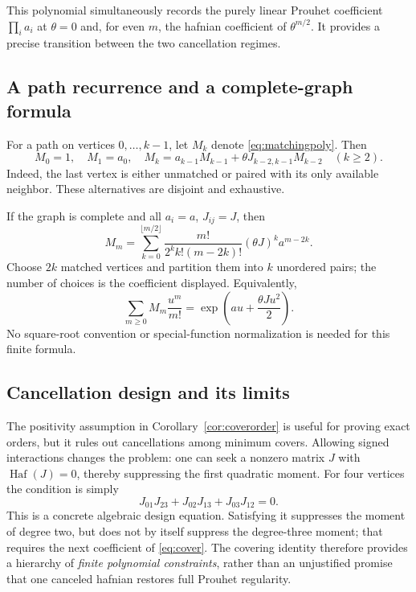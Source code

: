\documentclass[11pt,oneside]{article}
\numberwithin{equation}{section}
\theoremstyle{definition}
\theoremstyle{remark}
\DeclareMathOperator{\Haf}{Haf}
\begin{document}
This polynomial simultaneously records the purely linear Prouhet coefficient
\(\prod_i a_i\) at \(\theta=0\) and, for even \(m\), the hafnian coefficient
of \(\theta^{m/2}\). It provides a precise transition between the two
cancellation regimes.

\subsection{A path recurrence and a complete-graph formula}
For a path on vertices \(0,\ldots,k-1\), let \(M_k\) denote
\eqref{eq:matchingpoly}. Then
\begin{equation}
 M_0=1,\quad M_1=a_0,\quad
 M_k=a_{k-1}M_{k-1}+\theta J_{k-2,k-1}M_{k-2}\quad(k\ge2).
 \label{eq:pathmatchrec}
\end{equation}
Indeed, the last vertex is either unmatched or paired with its only available
neighbor. These alternatives are disjoint and exhaustive.

If the graph is complete and all \(a_i=a\), \(J_{ij}=J\), then
\begin{equation}
 M_m=\sum_{k=0}^{\lfloor m/2\rfloor}
       \frac{m!}{2^k k!(m-2k)!}(\theta J)^k a^{m-2k}.
 \label{eq:completegraph}
\end{equation}
Choose \(2k\) matched vertices and partition them into \(k\) unordered pairs;
the number of choices is the coefficient displayed. Equivalently,
\begin{equation}
 \sum_{m\ge0}M_m\frac{u^m}{m!}
       =\exp\left(au+\frac{\theta J u^2}{2}\right).
 \label{eq:matchEGF}
\end{equation}
No square-root convention or special-function normalization is needed for this
finite formula.

\subsection{Cancellation design and its limits}
The positivity assumption in Corollary~\ref{cor:coverorder} is useful for
proving exact orders, but it rules out cancellations among minimum covers.
Allowing signed interactions changes the problem: one can seek a nonzero
matrix \(J\) with \(\Haf(J)=0\), thereby suppressing the first quadratic
moment. For four vertices the condition is simply
\[
 J_{01}J_{23}+J_{02}J_{13}+J_{03}J_{12}=0.
\]
This is a concrete algebraic design equation. Satisfying it suppresses the
moment of degree two, but does not by itself suppress the degree-three moment;
that requires the next coefficient of \eqref{eq:cover}. The covering identity
therefore provides a hierarchy of \emph{finite polynomial constraints}, rather
than an unjustified promise that one canceled hafnian restores full Prouhet
regularity.
\end{document}
